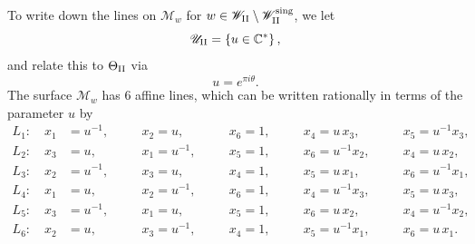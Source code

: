 \documentclass[a4paper,reqno]{amsart}
\numberwithin{equation}{section}
\newcommand{\C}{\mathbb{C}}
\numberwithin{equation}{section}
\begin{document}
To write down the lines on $\mathcal{M}_w$ for $w\in \mathscr{W}_{\rm{II}}\setminus \mathscr{W}_{\rm{II}}^{\operatorname{sing}}$, we let 
$$\mathscr{U}_{\rm{II}} = \left\{ u \in \C^{*} \right\},$$
and relate this to $\Theta_{\rm{II}}$ via $$u  = e^{\pi i \theta}.$$
The surface $\mathcal{M}_w$ has 6 affine lines, which can be written rationally in terms of the parameter $u$ by
\begin{equation} \label{eq:linesPII}
\begin{aligned}
    L_1 : \quad  x_1 &= u^{-1},\quad &&x_2= u,\quad &&x_6= 1,\quad &&x_4 = u\,x_3, \quad &&x_5= u^{-1} x_3,\\
    L_2 : \quad  x_3 &= u,\quad &&x_1= u^{-1},\quad &&x_5= 1,\quad &&x_6 = u^{-1} x_2, \quad &&x_4= u\,x_2,\\
    L_3 : \quad  x_2 &= u^{-1},\quad &&x_3= u,\quad &&x_4= 1,\quad &&x_5 = u\,x_1, \quad &&x_6= u^{-1} x_1,\\
    L_4 : \quad  x_1 &= u,\quad &&x_2= u^{-1},\quad &&x_6= 1,\quad &&x_4 = u^{-1} x_3, \quad &&x_5= u\,x_3,\\
    L_5 : \quad  x_3 &= u^{-1},\quad &&x_1= u,\quad &&x_5= 1,\quad &&x_6 = u\,x_2, \quad &&x_4= u^{-1} x_2,\\
    L_6 : \quad  x_2 &= u,\quad &&x_3= u^{-1},\quad &&x_4= 1,\quad &&x_5 = u^{-1} x_1, \quad &&x_6= u\,x_1.
    \end{aligned}
    \end{equation}

\end{document}
